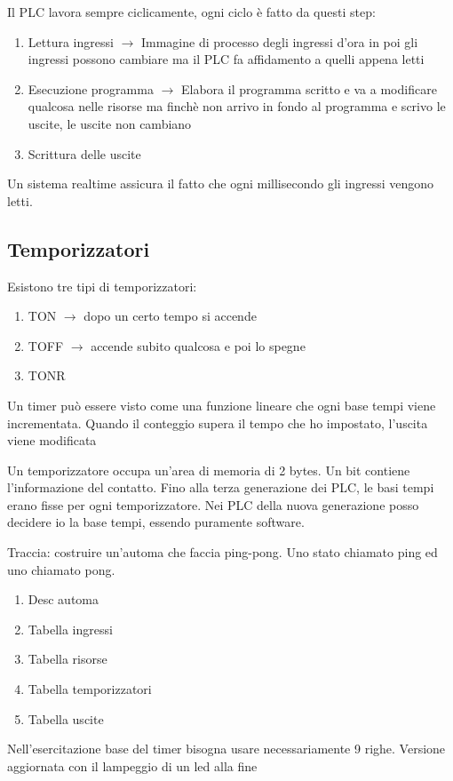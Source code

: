 \documentclass{article}
\begin{document}
    Il PLC lavora sempre ciclicamente, ogni ciclo è fatto da questi step:

    \begin{enumerate}
        \item Lettura ingressi $\rightarrow$ Immagine di processo degli ingressi d'ora in poi gli ingressi possono cambiare ma il PLC fa affidamento a quelli appena letti
        \item Esecuzione programma $\rightarrow$ Elabora il programma scritto e va a modificare qualcosa nelle risorse ma finchè non arrivo in fondo al programma e scrivo le uscite, le uscite non cambiano
        \item Scrittura delle uscite
    \end{enumerate}

    Un sistema realtime assicura il fatto che ogni millisecondo gli ingressi vengono letti.

    \subsection{Temporizzatori}

    Esistono tre tipi di temporizzatori:

    \begin{enumerate}
        \item TON $\rightarrow$ dopo un certo tempo si accende
        \item TOFF $\rightarrow$ accende subito qualcosa e poi lo spegne
        \item TONR
    \end{enumerate}

    Un timer può essere visto come una funzione lineare che ogni base tempi viene incrementata. Quando il conteggio supera il tempo che ho impostato, l'uscita viene modificata
    \newpage
    
    Un temporizzatore occupa un'area di memoria di 2 bytes. Un bit contiene l'informazione del contatto. \newline
    Fino alla terza generazione dei PLC, le basi tempi erano fisse per ogni temporizzatore. Nei PLC della nuova generazione posso decidere io la base tempi, essendo puramente software.

    Traccia: costruire un'automa che faccia ping-pong. Uno stato chiamato ping ed uno chiamato pong.

    \begin{enumerate}
        \item Desc automa
        \item Tabella ingressi
        \item Tabella risorse
        \item Tabella temporizzatori
        \item Tabella uscite
    \end{enumerate}

    Nell'esercitazione base del timer bisogna usare necessariamente 9 righe.\newline
    Versione aggiornata con il lampeggio di un led alla fine
\end{document}
